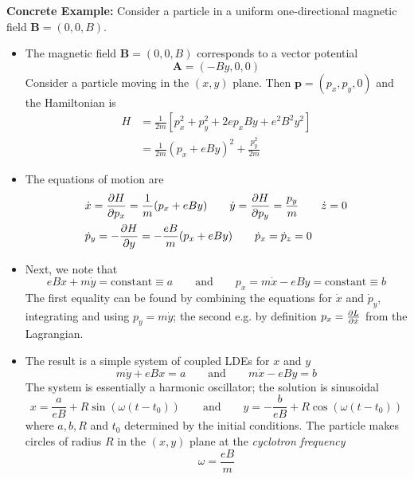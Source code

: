 \documentclass[11pt, a4paper]{article}
\newcommand{\eqtext}[1]{\qquad \text{#1} \qquad}
\begin{document}
\textbf{Concrete Example:} Consider a particle in a uniform one-directional magnetic field $ \bm{B} = (0, 0, B) $.
\begin{itemize}
	\item The magnetic field $ \bm{B} = (0, 0, B) $ corresponds to a vector potential
	\begin{equation*}
		\bm{A} = (-By, 0, 0)
	\end{equation*}
	Consider a particle moving in the $ (x,y) $ plane. Then $ \bm{p} = (p_{x}, p_{y}, 0) $ and the Hamiltonian is
	\begin{align*}
		H &= \frac{1}{2m}\left[p_{x}^{2} + p_{y}^{2} + 2ep_{x}B y + e^{2}B^{2}y^{2}\right]\\
		&=\frac{1}{2m}(p_{x} + e By)^{2} + \frac{p_{y}^{2}}{2m}
	\end{align*}
	
	\item The equations of motion are
	\begin{align*}
		&\dot{x} = \pdv{H}{p_{x}} = \frac{1}{m} (p_{x} + e By) \qquad \dot{y} = \pdv{H}{p_{y}} = \frac{p_{y}}{m} \qquad \dot{z} = 0\\
		&\dot{p}_{y} = - \pdv{H}{y} = -\frac{eB}{m}(p_{x} + eBy) \qquad \dot{p}_{x} = \dot{p}_{z} = 0
	\end{align*}
	
	\item Next, we note that
	\begin{equation*}
		eBx + m\dot{y} = \text{constant} \equiv a  \eqtext{and}
		p_{x} = m\dot{x} - eBy = \text{constant} \equiv b
	\end{equation*}
	The first equality can be found by combining the equations for $ \dot{x} $ and $ \dot{p}_{y} $, integrating and using $ p_{y} = m \dot{y} $; the second e.g. by definition $ p_{x} = \pdv{L}{\dot{x}} $ from the Lagrangian. 
	
	\item The result is a simple system of coupled LDEs for $ x $ and $ y $
	\begin{equation*}
		m\dot{y} + eBx = a \eqtext{and} m\dot{x} - eBy = b
	\end{equation*}
	The system is essentially a harmonic oscillator; the solution is sinusoidal
	\begin{equation*}
		x = \frac{a}{eB} + R \sin (\omega(t - t_{0})) \eqtext{and} y = -\frac{b}{eB} + R \cos (\omega(t - t_{0}))
	\end{equation*}
	where $ a, b, R $ and $ t_{0} $ determined by the initial conditions. The particle makes circles of radius $ R $ in the $ (x, y) $ plane at the \textit{cyclotron frequency}
	\begin{equation*}
	 	\omega = \frac{eB}{m}
	\end{equation*}
\end{itemize}
\end{document}
